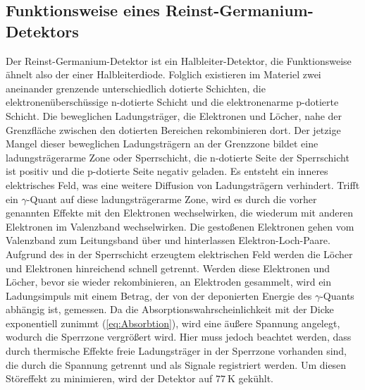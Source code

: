 \subsection{Funktionsweise eines Reinst-Germanium-Detektors}
Der Reinst-Germanium-Detektor ist ein Halbleiter-Detektor, die Funktionsweise ähnelt also der einer Halbleiterdiode.
Folglich existieren im Materiel zwei aneinander grenzende unterschiedlich dotierte Schichten, die elektronenüberschüssige n-dotierte Schicht und die elektronenarme p-dotierte Schicht.
Die beweglichen Ladungsträger, die Elektronen und Löcher, nahe der Grenzfläche zwischen den dotierten Bereichen rekombinieren dort.
Der jetzige Mangel dieser beweglichen Ladungsträgern an der Grenzzone bildet eine ladungsträgerarme Zone oder Sperrschicht, die n-dotierte Seite der Sperrschicht ist positiv und die p-dotierte Seite negativ geladen.
Es entsteht ein inneres elektrisches Feld, was eine weitere Diffusion von Ladungsträgern verhindert.
Trifft ein $\gamma$-Quant auf diese ladungsträgerarme Zone, wird es durch die vorher genannten Effekte mit den Elektronen wechselwirken, die wiederum mit anderen Elektronen im Valenzband wechselwirken.
Die gestoßenen Elektronen gehen vom Valenzband zum Leitungsband über und hinterlassen Elektron-Loch-Paare.
Aufgrund des in der Sperrschicht erzeugtem elektrischen Feld werden die Löcher und Elektronen hinreichend schnell getrennt.
Werden diese Elektronen und Löcher, bevor sie wieder rekombinieren, an Elektroden gesammelt, wird ein Ladungsimpuls mit einem Betrag, der von der deponierten Energie des $\gamma$-Quants abhängig ist, gemessen.
Da die Absorptionswahrscheinlichkeit mit der Dicke exponentiell zunimmt (\ref{eq:Absorbtion}), wird eine äußere Spannung angelegt, wodurch die Sperrzone vergrößert wird.
Hier muss jedoch beachtet werden, dass durch thermische Effekte freie Ladungsträger in der Sperrzone vorhanden sind, die durch die Spannung getrennt und als Signale registriert werden.
Um diesen Störeffekt zu minimieren, wird der Detektor auf $\SI{77}{\kelvin}$ gekühlt.

